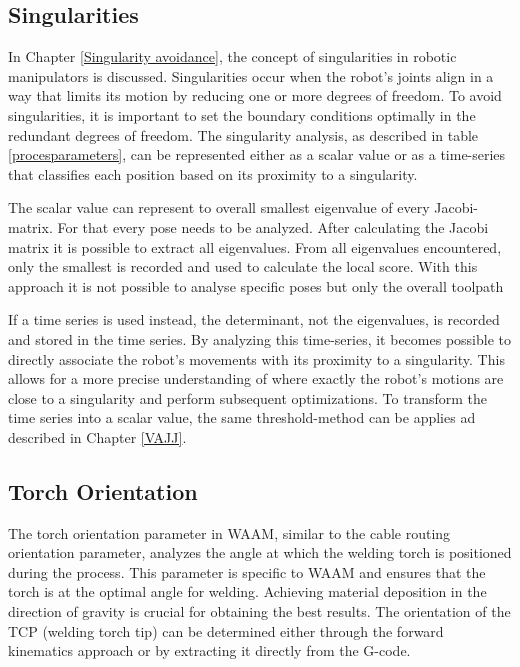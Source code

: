 \subsection{Singularities}
In Chapter \ref{Singularity avoidance}, the concept of singularities in robotic manipulators is discussed. Singularities occur when the robot's joints align in a way that limits its motion by reducing one or more degrees of freedom. To avoid singularities, it is important to set the boundary conditions optimally in the redundant degrees of freedom. The singularity analysis, as described in table \ref{procesparameters}, can be represented either as a scalar value or as a time-series that classifies each position based on its proximity to a singularity.

The scalar value can represent to overall smallest eigenvalue of every Jacobi-matrix. For that every pose needs to be analyzed. After calculating the Jacobi matrix it is possible to extract all eigenvalues. From all eigenvalues encountered, only the smallest is recorded and used to calculate the local score. With this approach it is not possible to analyse specific poses but only the overall toolpath




If a time series is used instead, the determinant, not the eigenvalues, is recorded and stored in the time series. By analyzing this time-series, it becomes possible to directly associate the robot's movements with its proximity to a singularity. This allows for a more precise understanding of where exactly the robot's motions are close to a singularity and perform subsequent optimizations. To transform the time series into a scalar value, the same threshold-method can be applies ad described in Chapter \ref{VAJJ}.
  
  




\subsection{Torch Orientation}
The torch orientation parameter in WAAM, similar to the cable routing orientation parameter, analyzes the angle at which the welding torch is positioned during the process. This parameter is specific to WAAM and ensures that the torch is at the optimal angle for welding. Achieving material deposition in the direction of gravity is crucial for obtaining the best results. The orientation of the TCP (welding torch tip) can be determined either through the forward kinematics approach or by extracting it directly from the G-code.


